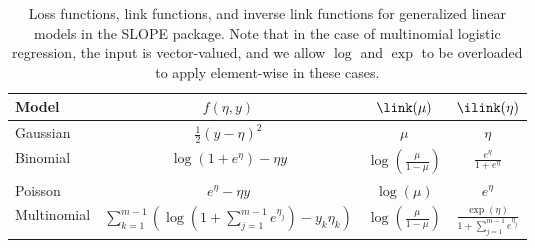 \documentclass[article]{jss}
\begin{document}
\begin{table}[t!]
  \centering
  \label{tab:glm}
  \begin{tabular}{lccc}
    \toprule
    Model       & \(f(\eta, y)\)                                                                                       & \(\link(\mu)\)                            & \(\ilink(\eta)\)                                       \\
    \midrule
    Gaussian    & \(\frac{1}{2}(y - \eta)^2\)                                                                          & \(\mu\)                                   & \(\eta\)                                               \\
    \addlinespace
    Binomial    & \(\log(1 + e^\eta) - \eta y\)                                                                        & \(\log \left(\frac{\mu}{1 - \mu}\right)\) & \(\frac{e^\eta}{1 + e^\eta}\)                          \\
    \addlinespace
    Poisson     & \(e^\eta - \eta y\)                                                                                  & \(\log(\mu)\)                             & \(e^\eta\)                                             \\
    \addlinespace
    Multinomial & \(\sum_{k=1}^{m-1}\left( \log \left( 1 +  \sum_{j=1}^{m-1} e^{\eta_j}\right) - y_k \eta_k  \right)\) & \(\log\left(\frac{\mu}{1 - \mu}\right) \) & \(\frac{\exp(\eta)}{1 + \sum_{j=1}^{m-1} e^{\eta_j}}\) \\
    \bottomrule
  \end{tabular}
  \caption{Loss functions, link functions, and inverse link functions for
    generalized linear models in the SLOPE package. Note that in the case of
    multinomial logistic regression, the input is vector-valued, and we allow
    \(\log\) and \(\exp\) to be overloaded to apply element-wise in these cases.
  }
\end{table}
\end{document}

